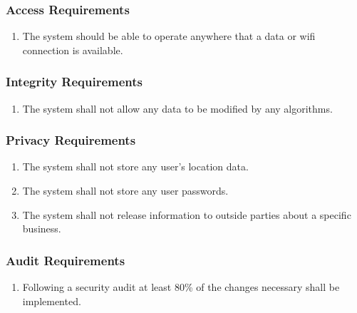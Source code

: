 \documentclass[titlepage]{article}
\newcounter{req}
\begin{document}
		\subsubsection{Access Requirements}
		\label{ssub:access_requirements}
		\begin{enumerate}[{SR}1. ]
		\setcounter{enumi}{\value{req}}
			\item
			The system should be able to operate anywhere that a data or wifi connection is available.
		\setcounter{req}{\theenumi}
		\end{enumerate}
		
		\subsubsection{Integrity Requirements}
		\label{ssub:integrity_requirements}
		\begin{enumerate}[{SR}1. ]
		\setcounter{enumi}{\value{req}}
			\item 
			The system shall not allow any data to be modified by any algorithms.
		\setcounter{req}{\theenumi}
		\end{enumerate}
		
		\subsubsection{Privacy Requirements}
		\label{ssub:privacy_requirements}
		\begin{enumerate}[{SR}1. ]
		\setcounter{enumi}{\value{req}}
			\item 
			The system shall not store any user's location data.
			\item
			The system shall not store any user passwords.
			\item
			The system shall not release information to outside parties about a specific business.
		\setcounter{req}{\theenumi}
		\end{enumerate}
		
		\subsubsection{Audit Requirements}
		\label{ssub:audit_requirements}
		\begin{enumerate}[{SR}1. ]
		\setcounter{enumi}{\value{req}}
			\item 
			Following a security audit at least 80\% of the changes necessary shall be implemented.
		\setcounter{req}{\theenumi}
		\end{enumerate}
		
\end{document}
